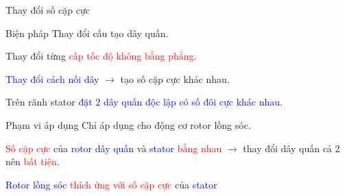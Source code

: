 \documentclass{beamer}
\begin{document}
\begin{frame}{Thay đổi số cặp cực}
	\begin{block}{Biện pháp}
		\justifying
		Thay đổi \textcolor{doden}{cấu tạo dây quấn}.
		\begin{list}{--}{}
			\item Thay đổi từng \textcolor{red}{cấp tốc độ không bằng phẳng}.
			\item \textcolor{blue}{Thay đổi cách nối dây} $\longrightarrow$ tạo số cặp cực khác nhau.
			\item Trên rãnh stator \textcolor{blue}{đặt 2 dây quấn độc lập có số đôi cực khác nhau}.
		\end{list}
   \end{block}
   \begin{block}{Phạm vi áp dụng}
   		\justifying
		Chỉ áp dụng cho động cơ \textcolor{doden}{rotor lồng sóc}.
		\begin{list}{--}{}
			\item \textcolor{red}{Số cặp cực} của \textcolor{blue}{rotor dây quấn} và \textcolor{blue}{stator} \textcolor{red}{bằng nhau} $\longrightarrow$ thay đổi dây quấn cả 2 nên \textcolor{red}{bất tiện}.
			\item \textcolor{blue}{Rotor lồng sóc} \textcolor{red}{thích ứng với số cặp cực} của \textcolor{blue}{stator}
		\end{list}
   \end{block}
\end{frame}

\end{document}
